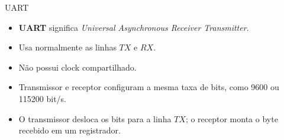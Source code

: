 \begin{frame}{UART}
\begin{itemize}
  \item \textbf{UART} significa \textit{Universal Asynchronous Receiver Transmitter}.
  \item Usa normalmente as linhas \(TX\) e \(RX\).
  \item Não possui clock compartilhado.
  \item Transmissor e receptor configuram a mesma taxa de bits, como 9600 ou 115200 bit/s.
  \item O transmissor desloca os bits para a linha \(TX\); o receptor monta o byte recebido em um registrador.
\end{itemize}
\end{frame}